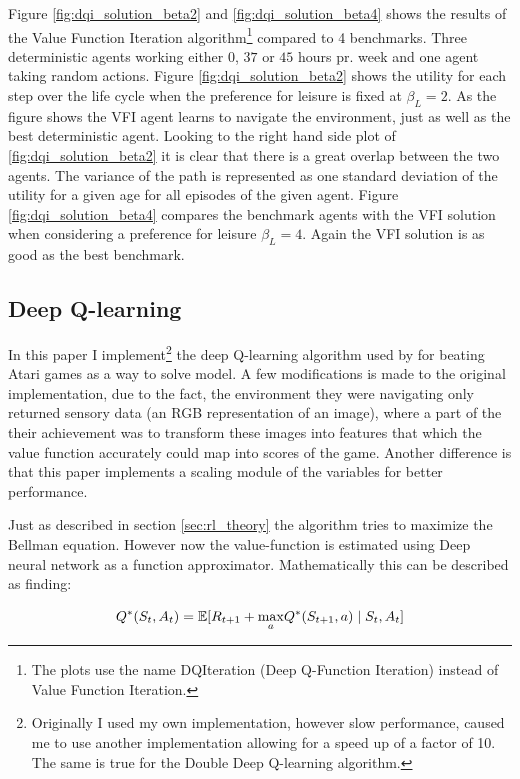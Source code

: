Figure \ref{fig:dqi_solution_beta2} and \ref{fig:dqi_solution_beta4} shows the results of the Value Function Iteration algorithm\footnote{The plots use the name DQIteration (Deep Q-Function Iteration) instead of Value Function Iteration.} compared to 4 benchmarks. Three deterministic agents working either $0$, $37$ or $45$ hours pr. week and one agent taking random actions. Figure \ref{fig:dqi_solution_beta2} shows the utility for each step over the life cycle when the preference for leisure is fixed at $\beta_L = 2$. As the figure shows the VFI agent learns to navigate the environment, just as well as the best deterministic agent. Looking to the right hand side plot of \ref{fig:dqi_solution_beta2} it is clear that there is a great overlap between the two agents. The variance of the path is represented as one standard deviation of the utility for a given age for all episodes of the given agent. Figure \ref{fig:dqi_solution_beta4} compares the benchmark agents with the VFI solution when considering a preference for leisure $\beta_L = 4$. Again the VFI solution is as good as the best benchmark.

\subsection{Deep Q-learning}

In this paper I implement\footnote{Originally I used my own implementation, however slow performance, caused me to use another implementation allowing for a speed up of a factor of 10. The same is true for the Double Deep Q-learning algorithm.} the deep Q-learning algorithm used by \textcite{mnih_playing_2013} for beating Atari games as a way to solve model. A few modifications is made to the original implementation, due to the fact, the environment they were navigating only returned sensory data (an RGB representation of an image), where a part of the their achievement was to transform these images into features that which the value function accurately could map into scores of the game. Another difference is that this paper implements a scaling module of the variables for better performance.

Just as described in section \ref{sec:rl_theory} the algorithm tries to maximize the Bellman equation. However now the value-function is estimated using Deep neural network as a function approximator. Mathematically this can be described as finding:

\begin{equation}
    Q^*(S_t,A_t) = \mathbb{E} [R_{t+1} + \underset{a}{\max}  Q^*(S_{t+1}, a) \mid S_t, A_t]
\end{equation}

